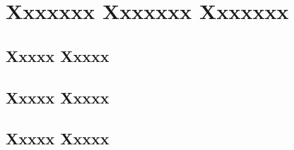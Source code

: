 \chapter{Xxxxxxx Xxxxxxx Xxxxxxx}
\lipsum
\section{Xxxxx Xxxxx}
\lipsum
\section{Xxxxx Xxxxx}
\lipsum
\section{Xxxxx Xxxxx}
\lipsum

